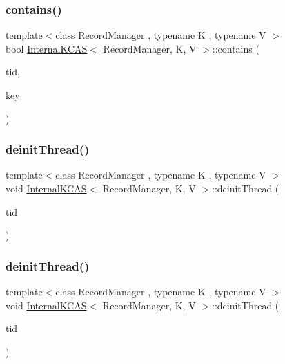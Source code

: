 \subsubsection{\texorpdfstring{contains()}{contains()}\hspace{0.1cm}{\footnotesize\ttfamily [2/2]}}
{\footnotesize\ttfamily template$<$class Record\+Manager , typename K , typename V $>$ \\
bool \hyperlink{classInternalKCAS}{Internal\+K\+C\+AS}$<$ Record\+Manager, K, V $>$\+::contains (\begin{DoxyParamCaption}\item[{const int}]{tid,  }\item[{const K \&}]{key }\end{DoxyParamCaption})\hspace{0.3cm}{\ttfamily [inline]}}

\mbox{\label{classInternalKCAS_a34b83ecf38951b339abc5e1270d97c84}} 
\subsubsection{\texorpdfstring{deinit\+Thread()}{deinitThread()}\hspace{0.1cm}{\footnotesize\ttfamily [1/2]}}
{\footnotesize\ttfamily template$<$class Record\+Manager , typename K , typename V $>$ \\
void \hyperlink{classInternalKCAS}{Internal\+K\+C\+AS}$<$ Record\+Manager, K, V $>$\+::deinit\+Thread (\begin{DoxyParamCaption}\item[{const int}]{tid }\end{DoxyParamCaption})}

\mbox{\label{classInternalKCAS_a34b83ecf38951b339abc5e1270d97c84}} 
\subsubsection{\texorpdfstring{deinit\+Thread()}{deinitThread()}\hspace{0.1cm}{\footnotesize\ttfamily [2/2]}}
{\footnotesize\ttfamily template$<$class Record\+Manager , typename K , typename V $>$ \\
void \hyperlink{classInternalKCAS}{Internal\+K\+C\+AS}$<$ Record\+Manager, K, V $>$\+::deinit\+Thread (\begin{DoxyParamCaption}\item[{const int}]{tid }\end{DoxyParamCaption})}

